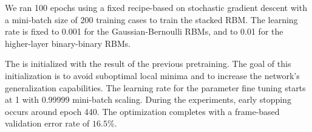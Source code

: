 We ran 100 epochs using a fixed recipe-based on stochastic gradient descent with a mini-batch size of 200 training cases
to train  the stacked RBM. The learning rate is fixed to 0.001 for the Gaussian-Bernoulli RBMs,
and to 0.01 for the higher-layer binary-binary RBMs.






%
%
The \DBN is initialized with the result of the previous pretraining. The goal of this initialization is to avoid suboptimal local minima and to increase
the network's generalization capabilities.
The learning rate for the parameter fine tuning
starts at 1 with 0.99999 mini-batch scaling. During the experiments, early stopping occurs around epoch 440.
The optimization completes with a frame-based validation error rate of $16.5\%$.%




